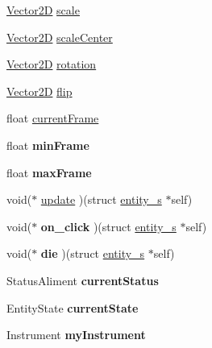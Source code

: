 \begin{DoxyCompactItemize}
\item 
\hyperlink{struct_vector2_d}{Vector2D} \hyperlink{structentity__s_a1b187f4d1f81894380925e9de933801a}{scale}
\item 
\hyperlink{struct_vector2_d}{Vector2D} \hyperlink{structentity__s_a8ff0fe80de1fcc51fee6f1d766e9de8b}{scale\+Center}
\item 
\hyperlink{struct_vector2_d}{Vector2D} \hyperlink{structentity__s_ac4e0ffa54c436c5dad6ca9481266f9ed}{rotation}
\item 
\hyperlink{struct_vector2_d}{Vector2D} \hyperlink{structentity__s_afc50ca9ba71427ea7962929de4b0e1bb}{flip}
\item 
float \hyperlink{structentity__s_a6c816fc91c0d3b73641b802cc889195d}{current\+Frame}
\item 
\mbox{\label{structentity__s_a01ee90dc9c4db69ef58c8c6d8ba67f28}} 
float {\bfseries min\+Frame}
\item 
\mbox{\label{structentity__s_a0fe584f9e9339b6558acfff9faafe187}} 
float {\bfseries max\+Frame}
\item 
void($\ast$ \hyperlink{structentity__s_ae4dad0223ba78dddff3177bd20960ff2}{update} )(struct \hyperlink{structentity__s}{entity\+\_\+s} $\ast$self)
\item 
\mbox{\label{structentity__s_a4585fbbdf8aed52da0855955d1a462ad}} 
void($\ast$ {\bfseries on\+\_\+click} )(struct \hyperlink{structentity__s}{entity\+\_\+s} $\ast$self)
\item 
\mbox{\label{structentity__s_ab7c43f12b245296f839eda999ed25896}} 
void($\ast$ {\bfseries die} )(struct \hyperlink{structentity__s}{entity\+\_\+s} $\ast$self)
\item 
\mbox{\label{structentity__s_ad5a194015ada8926cdf00ff425d04d8a}} 
Status\+Aliment {\bfseries current\+Status}
\item 
\mbox{\label{structentity__s_a99fdae70672313aa145567525bb13042}} 
Entity\+State {\bfseries current\+State}
\item 
\mbox{\label{structentity__s_ab2c76805fde47894da8bf16f81963db7}} 
Instrument {\bfseries my\+Instrument}
\item 

\end{DoxyCompactItemize}

